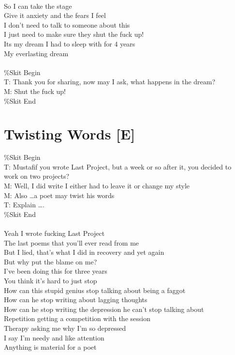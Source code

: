\documentclass[12pt, b5paper, oneside]{book}
\begin{document}
\\So I can take the stage
\\Give it anxiety and the fears I feel
\\I don't need to talk to someone about this
\\I just need to make sure they shut the fuck up!
\\Its my dream I had to sleep with for 4 years
\\My everlasting dream
%
\\\\\%Skit Begin
\\T: Thank you for sharing, now may I ask, what happens in the dream?
\\M: Shut the fuck up!
\\\%Skit End


\newpage
\section{Twisting Words [E]}
\%Skit Begin
\\T: Mustafif you wrote Last Project, but a week or so after it, you decided to work on two projects?
\\M: Well, I did write I either had to leave it or change my style
\\M: Also \dots a poet may twist his words
\\T: Explain \dots .
\\\%Skit End
%
\\\\Yeah I wrote fucking Last Project
\\The last poems that you'll ever read from me
\\But I lied, that's what I did in recovery and yet again
\\But why put the blame on me?
\\I've been doing this for three years
\\You think it's hard to just stop
\\How can this stupid genius stop talking about being a faggot
\\How can he stop writing about lagging thoughts
\\How can he stop writing the depression he can't stop talking about
\\Repetition getting a competition with the session
\\Therapy asking me why I'm so depressed
\\I say I'm needy and like attention
\\Anything is material for a poet
\end{document}
